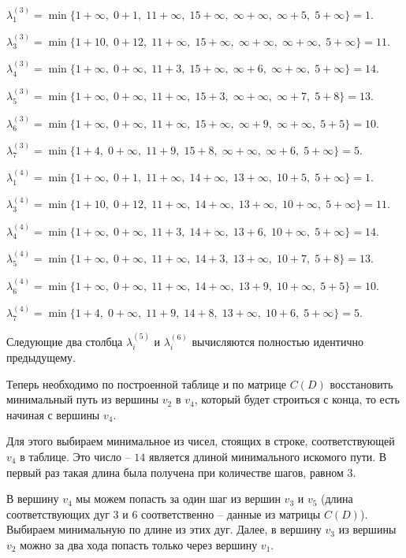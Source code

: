 \documentclass[fleqn]{article}
\begin{document}
\medskip

$\lambda_1^{(3)} =\min\{1+\infty,\; 0+1,\; 11+\infty,\; 15+\infty,\; \infty+\infty,\; \infty+5,\; 5+\infty\}=1.$

$\lambda_3^{(3)} =\min\{1+10,\; 0+12,\; 11+\infty,\; 15+\infty,\; \infty+\infty,\; \infty+\infty,\; 5+\infty\}=11.$

$\lambda_4^{(3)} =\min\{1+\infty,\; 0+\infty,\; 11+3,\; 15+\infty,\; \infty+6,\; \infty+\infty,\; 5+\infty\}=14.$

$\lambda_5^{(3)} =\min\{1+\infty,\; 0+\infty,\; 11+\infty,\; 15+3,\; \infty+\infty,\; \infty+7,\; 5+8\}=13.$

$\lambda_6^{(3)} =\min\{1+\infty,\; 0+\infty,\; 11+\infty,\; 15+\infty,\; \infty+9,\; \infty+\infty,\; 5+5\}=10.$

$\lambda_7^{(3)} =\min\{1+4,\; 0+\infty,\; 11+9,\; 15+8,\; \infty+\infty,\; \infty+6,\; 5+\infty\}=5.$

\medskip

$\lambda_1^{(4)} =\min\{1+\infty,\; 0+1,\; 11+\infty,\; 14+\infty,\; 13+\infty,\; 10+5,\; 5+\infty\}=1.$

$\lambda_3^{(4)} =\min\{1+10,\; 0+12,\; 11+\infty,\; 14+\infty,\; 13+\infty,\; 10+\infty,\; 5+\infty\}=11.$

$\lambda_4^{(4)} =\min\{1+\infty,\; 0+\infty,\; 11+3,\; 14+\infty,\; 13+6,\; 10+\infty,\; 5+\infty\}=14.$

$\lambda_5^{(4)} =\min\{1+\infty,\; 0+\infty,\; 11+\infty,\; 14+3,\; 13+\infty,\; 10+7,\; 5+8\}=13.$

$\lambda_6^{(4)} =\min\{1+\infty,\; 0+\infty,\; 11+\infty,\; 14+\infty,\; 13+9,\; 10+\infty,\; 5+5\}=10.$

$\lambda_7^{(4)} =\min\{1+4,\; 0+\infty,\; 11+9,\; 14+8,\; 13+\infty,\; 10+6,\; 5+\infty\}=5.$

\medskip

Следующие два столбца $\lambda_i^{(5)}$ и $\lambda_i^{(6)}$ вычисляются полностью идентично предыдущему.

Теперь необходимо по построенной таблице и по матрице $C(D)$ восстановить минимальный путь из вершины $v_2$ в $v_4$, который будет строиться с конца, то есть начиная с вершины $v_4$.

Для этого выбираем минимальное из чисел, стоящих в строке, соответствующей $v_4$ в таблице. Это число – $14$ является длиной минимального искомого пути. В первый раз такая длина была получена при количестве шагов, равном $3$.

В вершину $v_4$ мы можем попасть за один шаг из вершин $v_3$ и $v_5$ (длина соответствующих дуг $3$ и $6$ соответственно – данные из матрицы $C(D)$). Выбираем минимальную по длине из этих дуг. Далее, в вершину $v_3$  из вершины $v_2$ можно за два хода попасть только через вершину $v_1$.
\end{document}
